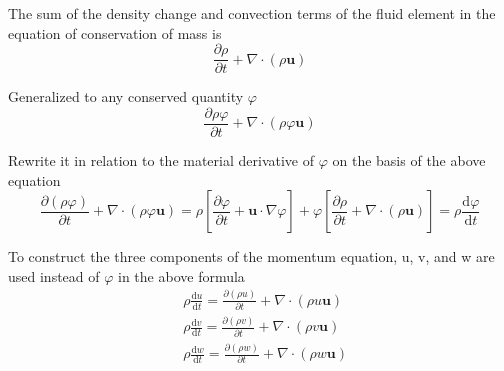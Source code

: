 \documentclass{apmcmthesis}
\begin{document}
The sum of the density change and convection terms of the fluid element in the equation of conservation of mass is
\begin{equation}
\frac{\partial \rho }{\partial t} +\nabla\cdot (\rho \textbf{u} )
\end{equation}

Generalized to any conserved quantity $\varphi$
\begin{equation}
\frac{\partial \rho \varphi }{\partial t} +\nabla\cdot (\rho \varphi \textbf{u} )
\end{equation}

Rewrite it in relation to the material derivative of $\varphi$ on the basis of the above equation
\begin{equation}
\frac{\partial (\rho \varphi )}{\partial t} +\nabla\cdot (\rho \varphi \textbf{u})=\rho [\frac{\partial \varphi }{\partial t}+ \textbf{u}\cdot \nabla\varphi]+\varphi[\frac{\partial \rho }{\partial t}+\nabla\cdot(\rho \textbf{u}) ]=\rho \frac{\mathrm{d} \varphi }{\mathrm{d} t} 
\end{equation}

To construct the three components of the momentum equation, u, v, and w are used instead of $\varphi$ in the above formula
\begin{equation}
\begin{aligned}
&\rho \frac{\mathrm{d} u}{\mathrm{d} t}=\frac{\partial (\rho u)}{\partial t}+\nabla\cdot (\rho u\textbf{u})  \\
&\rho \frac{\mathrm{d} v}{\mathrm{d} t}=\frac{\partial (\rho v)}{\partial t}+\nabla\cdot (\rho v\textbf{u})\\
&\rho \frac{\mathrm{d} w}{\mathrm{d} t}=\frac{\partial (\rho w)}{\partial t}+\nabla\cdot (\rho w\textbf{u})
\end{aligned}
\end{equation}
\end{document}
